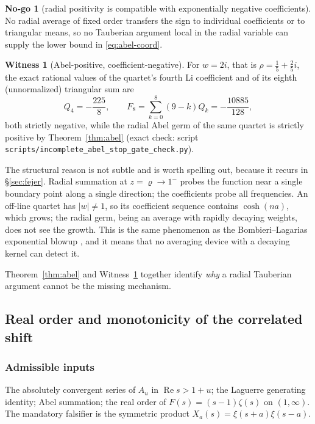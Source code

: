 \documentclass[11pt]{amsart}
\theoremstyle{definition}
\theoremstyle{remark}
\theoremstyle{definition}
\newtheorem{nogo}{No-go}[section]
\newtheorem{witness}{Witness}[section]
\renewcommand{\Re}{\operatorname{Re}}
\begin{document}
\begin{nogo}[radial positivity is compatible with exponentially negative
coefficients]\label{ng:abel}
No radial average of fixed order transfers the sign to individual coefficients or to triangular
means, so no Tauberian argument local in the radial variable can supply the lower bound in
\eqref{eq:abel-coord}.
\end{nogo}

\begin{witness}[Abel-positive, coefficient-negative]\label{wit:abel}
For $w=2i$, that is $\rho=\tfrac15+\tfrac25i$, the exact rational values of the quartet's fourth
Li coefficient and of its eighth (unnormalized) triangular sum are
\[
   Q_4=-\frac{225}{8},\qquad F_8=\sum_{k=0}^{8}(9-k)Q_k=-\frac{10885}{128},
\]
both strictly negative, while the radial Abel germ of the same quartet is strictly positive by
Theorem~\ref{thm:abel} (exact check: script \texttt{scripts/incomplete\_abel\_stop\_gate\_check.py}).
\end{witness}

\noindent The structural reason is not subtle and is worth spelling out, because it recurs in
\S\ref{sec:fejer}. Radial summation at $z=\varrho\to1^-$ probes the function near a single
boundary point along a single direction; the coefficients probe all frequencies. An off-line
quartet has $|w|\ne1$, so its coefficient sequence contains $\cosh(na)$, which grows; the
radial germ, being an average with rapidly decaying weights, does not see the growth. This is the
same phenomenon as the Bombieri--Lagarias exponential blowup \cite{BombieriLagarias1999}, and it
means that no averaging device with a decaying kernel can detect it.

Theorem~\ref{thm:abel} and Witness~\ref{wit:abel} together identify \emph{why} a radial Tauberian
argument cannot be the missing mechanism.

\subsection{Real order and monotonicity of the correlated shift}\label{sec:shift}

\subsubsection*{Admissible inputs}
The absolutely convergent series of $A_u$ in $\Re s>1+u$; the Laguerre generating identity; Abel
summation; the real order of $F(s)=(s-1)\zeta(s)$ on $(1,\infty)$. The mandatory falsifier is the
symmetric product $X_a(s)=\xi(s+a)\xi(s-a)$.
\end{document}
